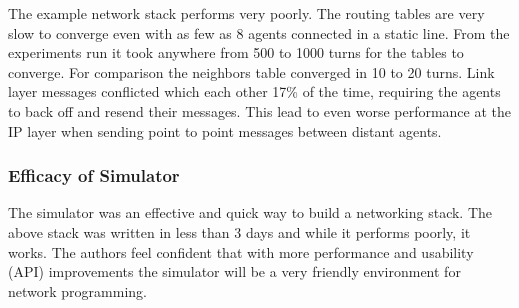 The example network stack performs very poorly. The routing tables are very slow to converge even
with as few as 8 agents connected in a static line. From the experiments run it took anywhere from
500 to 1000 turns for the tables to converge. For comparison the neighbors table converged in 10 to
20 turns. Link layer messages conflicted which each other 17\% of the time, requiring the agents to
back off and resend their messages. This lead to even worse performance at the IP layer when sending
point to point messages between distant agents.

\subsubsection{Efficacy of Simulator}

The simulator was an effective and quick way to build a networking stack. The above stack was
written in less than 3 days and while it performs poorly, it works. The authors feel confident that
with more performance and usability (API) improvements the simulator will be a very friendly
environment for network programming. 

